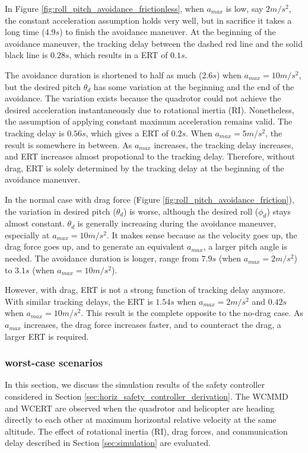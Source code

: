 \documentclass[journal,11pt,onecolumn,draftclsnofoot,]{IEEEtran}
\begin{document}
In Figure \ref{fig:roll_pitch_avoidance_frictionless}, when $a_{max}$ is low, say $2m/s^2$, the constant acceleration assumption holds very well, but in sacrifice it takes a long time ($4.9 s$) to finish the avoidance maneuver. At the beginning of the avoidance maneuver, the tracking delay between the dashed red line and the solid black line is $0.28s$, which results in a ERT of $0.1s$.

The avoidance duration is shortened to half as much ($2.6 s$) when $a_{max}=10m/s^2$, but the desired pitch $\theta_d$ has some variation at the beginning and the end of the avoidance. The variation exists because the quadrotor could not achieve the desired acceleration instantaneously due to rotational inertia (RI). Nonetheless, the assumption of applying constant maximum acceleration remains valid. The tracking delay is $0.56s$, which gives a ERT of $0.2s$. When $a_{max}=5m/s^2$, the result is somewhere in between. As $a_{max}$ increases, the tracking delay increases, and ERT increases almost propotional to the tracking delay. Therefore, without drag, ERT is solely determined by the tracking delay at the beginning of the avoidance maneuver.

In the normal case with drag force (Figure \ref{fig:roll_pitch_avoidance_friction}), the variation in desired pitch ($\theta_d$) is worse, although the desired roll ($\phi_d$) stays almost constant. $\theta_d$ is generally increasing during the avoidance maneuver, especially at $a_{max}=10m/s^2$. It makes sense because as the velocity goes up, the drag force goes up, and to generate an equivalent $a_{max}$, a larger pitch angle is needed. The avoidance duration is longer, range from $7.9s$ (when $a_{max}=2m/s^2$) to $3.1s$ (when $a_{max}=10m/s^2$).

However, with drag, ERT is not a strong function of tracking delay anymore. With similar tracking delays, the ERT is $1.54s$ when $a_{max}=2m/s^2$ and $0.42s$ when $a_{max}=10m/s^2$. This result is the complete opposite to the no-drag case. As $a_{max}$ increases, the drag force increases faster, and to counteract the drag, a larger ERT is required.


\subsubsection{worst-case scenarios}

In this section, we discuss the simulation results of the safety controller considered in Section \ref{sec:horiz_safety_controller_derivation}. The WCMMD and WCERT are observed when the quadrotor and helicopter are heading directly to each other at maximum horizontal relative velocity at the same altitude. The effect of rotational inertia (RI), drag forces, and communication delay described in Section \ref{sec:simulation} are evaluated.
\end{document}

